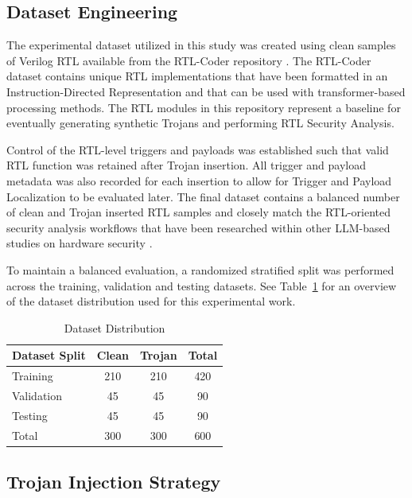 \documentclass[conference]{IEEEtran}
\begin{document}
\subsection{Dataset Engineering}
\label{subsec:dataset_engineering}

The experimental dataset utilized in this study was created using clean samples of Verilog RTL available from the RTL-Coder repository \cite{rtlcoder}. The RTL-Coder dataset contains unique RTL implementations that have been formatted in an Instruction-Directed Representation and that can be used with transformer-based processing methods. The RTL modules in this repository represent a baseline for eventually generating synthetic Trojans and performing RTL Security Analysis.

Control of the RTL-level triggers and payloads was established such that valid RTL function was retained after Trojan insertion. All trigger and payload metadata was also recorded for each insertion to allow for Trigger and Payload Localization to be evaluated later. The final dataset contains a balanced number of clean and Trojan inserted RTL samples and closely match the RTL-oriented security analysis workflows that have been researched within other LLM-based studies on hardware security \cite{kundu2025pearl,trojanwhisper}.

To maintain a balanced evaluation, a randomized stratified split was performed across the training, validation and testing datasets. See Table~\ref{tab:dataset_distribution} for an overview of the dataset distribution used for this experimental work.

\begin{table}[!t]
\caption{Dataset Distribution}
\label{tab:dataset_distribution}
\centering
\begin{tabular}{lccc}
\toprule
Dataset Split & Clean & Trojan & Total \\
\midrule
Training & 210 & 210 & 420 \\
Validation & 45 & 45 & 90 \\
Testing & 45 & 45 & 90 \\
Total & 300 & 300 & 600 \\
\bottomrule
\end{tabular}
\end{table}


\subsection{Trojan Injection Strategy}
\label{subsec:trojan_injection}
\end{document}
